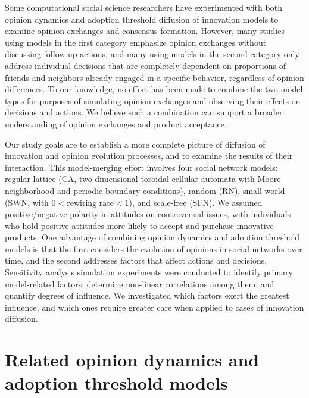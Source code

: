 \documentclass[10pt,letterpaper]{article}
\begin{document}
Some computational social science researchers have experimented with both opinion dynamics and adoption threshold diffusion of innovation models to examine opinion exchanges and consensus formation. However, many studies using models in the first category emphasize opinion exchanges without discussing follow-up actions, and many using models in the second category only address individual decisions that are completely dependent on proportions of friends and neighbors already engaged in a specific behavior, regardless of opinion differences. To our knowledge, no effort has been made to combine the two model types for purposes of simulating opinion exchanges and observing their effects on decisions and actions. We believe such a combination can support a broader understanding of opinion exchanges and product acceptance.

Our study goals are to establish a more complete picture of diffusion of innovation and opinion evolution processes, and to examine the results of their interaction. This model-merging effort involves four social network models: regular lattice (CA, two-dimensional toroidal cellular automata with Moore neighborhood and periodic boundary conditions), random (RN), small-world (SWN, with $0 < \text{rewiring rate} < 1$), and scale-free (SFN). We assumed positive/negative polarity in attitudes on controversial issues, with individuals who hold positive attitudes more likely to accept and purchase innovative products. One advantage of combining opinion dynamics and adoption threshold models is that the first considers the evolution of opinions in social networks over time, and the second addresses factors that affect actions and decisions. Sensitivity analysis simulation experiments were conducted to identify primary model-related factors, determine non-linear correlations among them, and quantify degrees of influence. We investigated which factors exert the greatest influence, and which ones require greater care when applied to cases of innovation diffusion.


\section*{Related opinion dynamics and adoption threshold models}
\end{document}
